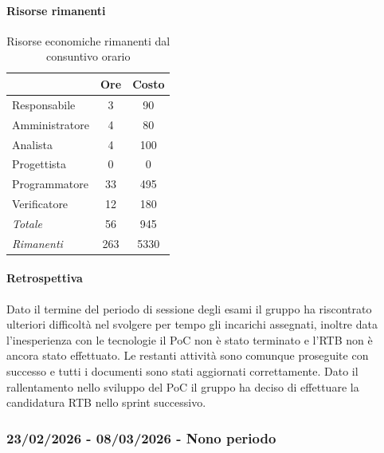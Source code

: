\documentclass[a4paper,12pt]{article}
\begin{document}
            \paragraph{Risorse rimanenti}
                \begin{table}[H]
                \centering
                \caption{Risorse economiche rimanenti dal consuntivo orario}
                \begin{tabular}{|l|c|c|}
                \hline
                    \rowcolor{lightgray}{\textbf{Ruolo}} & {\textbf{Ore}} & {\textbf{Costo}}\\
                \hline
                    Responsabile & 3 & 90\\
                \hline
                    Amministratore & 4 & 80\\
                \hline
                    Analista & 4 & 100\\
                \hline
                    Progettista & 0 & 0\\
                \hline
                    Programmatore & 33 & 495\\
                \hline
                    Verificatore & 12 & 180\\
                \hline
                    \rowcolor{lightgray}\textit{Totale} & 56 & 945\\
                \hline
                    \rowcolor{lightgray}\textit{Rimanenti} & 263 & 5330\\
                \hline
                \end{tabular}
                \end{table}
                
            \paragraph{Retrospettiva}
            Dato il termine del periodo di sessione degli esami il gruppo ha riscontrato ulteriori difficoltà nel svolgere per tempo gli incarichi assegnati, inoltre data l'inesperienza con le tecnologie il PoC non è stato terminato e l'RTB non è ancora stato effettuato. Le restanti attività sono comunque proseguite con successo e tutti i documenti sono stati aggiornati correttamente. Dato il rallentamento nello sviluppo del PoC il gruppo ha deciso di effettuare la candidatura RTB nello sprint successivo.


        \subsubsection{23/02/2026 - 08/03/2026 - Nono periodo}
\end{document}
